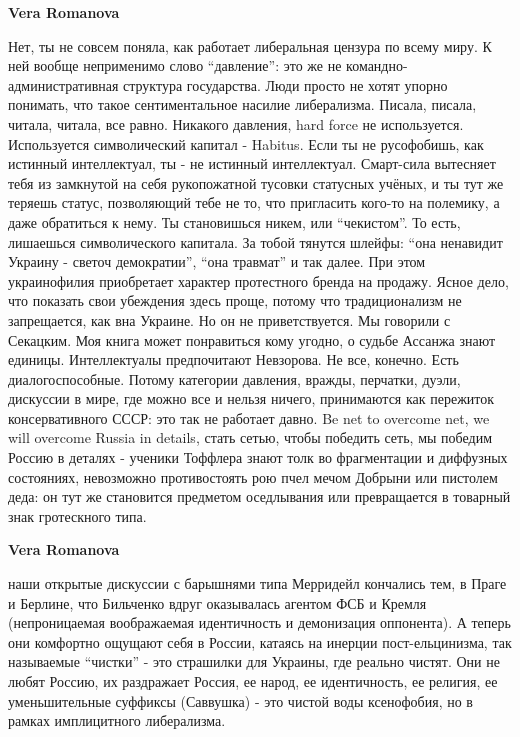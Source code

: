 \begin{itemize}
\begin{itemize} %
\textbf{Vera Romanova} 

Нет, ты не совсем поняла, как работает либеральная цензура по всему миру. К ней
вообще неприменимо слово \enquote{давление}: это же не командно-административная
структура государства. Люди просто не хотят упорно понимать, что такое
сентиментальное насилие либерализма. Писала, писала, читала, читала, все равно.
Никакого давления, hard force не используется. Используется символический
капитал - Habitus. Если ты не русофобишь, как истинный интеллектуал, ты - не
истинный интеллектуал. Смарт-сила вытесняет тебя из замкнутой на себя
рукопожатной тусовки статусных учёных, и ты тут же теряешь статус, позволяющий
тебе не то, что пригласить кого-то на полемику, а даже обратиться к нему. Ты
становишься никем, или \enquote{чекистом}. То есть, лишаешься символического капитала.
За тобой тянутся шлейфы: \enquote{она ненавидит Украину - светоч демократии}, \enquote{она
травмат} и так далее. При этом украинофилия приобретает характер протестного
бренда на продажу. Ясное дело, что показать свои убеждения здесь проще, потому
что традиционализм не запрещается, как вна Украине. Но он не приветствуется. Мы
говорили с Секацким. Моя книга может понравиться кому угодно, о судьбе Ассанжа
знают единицы. Интеллектуалы предпочитают Невзорова. Не все, конечно. Есть
диалогоспособные. Потому категории давления, вражды, перчатки, дуэли, дискуссии
в мире, где можно все и нельзя ничего, принимаются как пережиток
консервативного СССР: это так не работает давно. Be net to overcome net, we
will overcome Russia in details, стать сетью, чтобы победить сеть, мы победим
Россию в деталях - ученики Тоффлера знают толк во фрагментации и диффузных
состояниях, невозможно противостоять рою пчел мечом Добрыни или пистолем деда:
он тут же становится предметом оседлывания или превращается в товарный знак
гротескного типа.

\textbf{Vera Romanova} 

наши открытые дискуссии с барышнями типа Мерридейл кончались тем, в Праге и
Берлине, что Бильченко вдруг оказывалась агентом ФСБ и Кремля (непроницаемая
воображаемая идентичность и демонизация оппонента). А теперь они комфортно
ощущают себя в России, катаясь на инерции пост-ельцинизма, так называемые
\enquote{чистки} - это страшилки для Украины, где реально чистят. Они не любят Россию,
их раздражает Россия, ее народ, ее идентичность, ее религия, ее уменьшительные
суффиксы (Саввушка) - это чистой воды ксенофобия, но в рамках имплицитного
либерализма.


\end{itemize}
\end{itemize}
